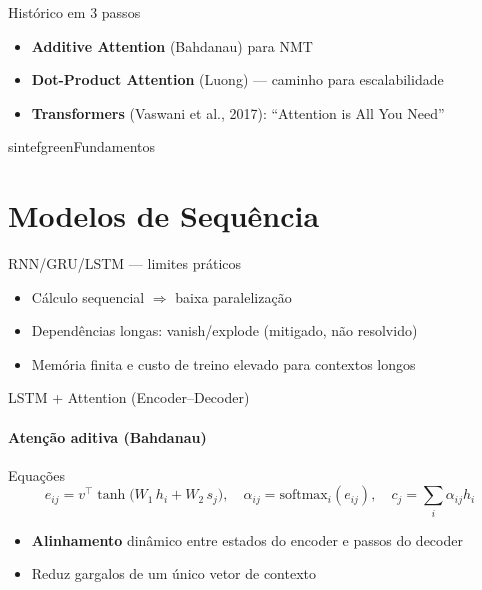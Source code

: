 \documentclass{beamer}
\begin{document}
\begin{frame}{Histórico em 3 passos}
\begin{itemize}[<+->]
  \item \textbf{Additive Attention} (Bahdanau) para NMT
  \item \textbf{Dot-Product Attention} (Luong) — caminho para escalabilidade
  \item \textbf{Transformers} (Vaswani et al., 2017): “Attention is All You Need”
\end{itemize}
\end{frame}

\begin{chapter}{sintefgreen}{Fundamentos}\end{chapter}

\section{Modelos de Sequência}
\begin{frame}{RNN/GRU/LSTM — limites práticos}
\begin{itemize}[<+->]
  \item Cálculo sequencial $\Rightarrow$ baixa paralelização
  \item Dependências longas: vanish/explode (mitigado, não resolvido)
  \item Memória finita e custo de treino elevado para contextos longos
\end{itemize}
\end{frame}

\begin{frame}{LSTM + Attention (Encoder--Decoder)}
\framesubtitle{Atenção aditiva (Bahdanau)}
\begin{block}{Equações}
\small
\[
e_{ij} = v^\top \tanh\!\big(W_1\,h_i + W_2\,s_j\big), \quad
\alpha_{ij} = \mathrm{softmax}_i(e_{ij}), \quad
c_j = \sum_i \alpha_{ij} h_i
\]
\end{block}
\begin{itemize}[<+->]
  \item \textbf{Alinhamento} dinâmico entre estados do encoder e passos do decoder
  \item Reduz gargalos de um único vetor de contexto
\end{itemize}
\end{frame}
\end{document}
